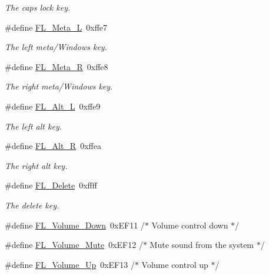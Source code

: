 \begin{Indent}
\begin{DoxyCompactItemize}
\begin{DoxyCompactList}\small\item\em The caps lock key. \end{DoxyCompactList}\item 
\#define \hyperlink{_enumerations_8_h_acbd392478a5e61f341fe44e24890e213}{F\+L\+\_\+\+Meta\+\_\+L}~0xffe7
\begin{DoxyCompactList}\small\item\em The left meta/\+Windows key. \end{DoxyCompactList}\item 
\#define \hyperlink{_enumerations_8_h_aa21f26e0bc5b3737cf8c0a1b89a200be}{F\+L\+\_\+\+Meta\+\_\+R}~0xffe8
\begin{DoxyCompactList}\small\item\em The right meta/\+Windows key. \end{DoxyCompactList}\item 
\#define \hyperlink{_enumerations_8_h_a94997ca62280cddce9327c32a256b61a}{F\+L\+\_\+\+Alt\+\_\+L}~0xffe9
\begin{DoxyCompactList}\small\item\em The left alt key. \end{DoxyCompactList}\item 
\#define \hyperlink{_enumerations_8_h_aa06e5417c1a4f46e591950c1a2c28301}{F\+L\+\_\+\+Alt\+\_\+R}~0xffea
\begin{DoxyCompactList}\small\item\em The right alt key. \end{DoxyCompactList}\item 
\#define \hyperlink{_enumerations_8_h_a323fcf5bab321ec05826a6510a0f1d5a}{F\+L\+\_\+\+Delete}~0xffff
\begin{DoxyCompactList}\small\item\em The delete key. \end{DoxyCompactList}\item 
\#define \hyperlink{_enumerations_8_h_afadeff33bd3f7cd13e7248e2f8f2f4a8}{F\+L\+\_\+\+Volume\+\_\+\+Down}~0x\+E\+F11   /$\ast$ Volume control down        $\ast$/
\item 
\#define \hyperlink{_enumerations_8_h_a65066ef24e1bb1348f59380bf62e44f7}{F\+L\+\_\+\+Volume\+\_\+\+Mute}~0x\+E\+F12   /$\ast$ Mute sound from the system $\ast$/
\item 
\#define \hyperlink{_enumerations_8_h_a264d7dd0a1a51ac40966c55002d6d7f6}{F\+L\+\_\+\+Volume\+\_\+\+Up}~0x\+E\+F13   /$\ast$ Volume control up          $\ast$/
\item 

\end{DoxyCompactItemize}
\end{Indent}
